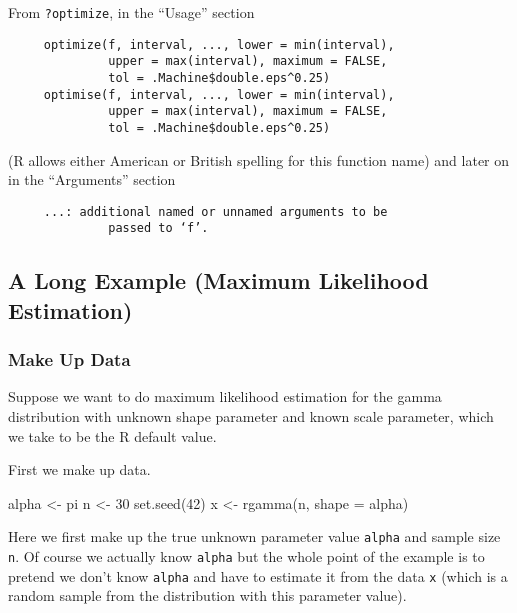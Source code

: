 \documentclass[
]{article}
\newenvironment{Shaded}{\begin{snugshade}}{\end{snugshade}}
\newcommand{\AttributeTok}[1]{\textcolor[rgb]{0.77,0.63,0.00}{#1}}
\newcommand{\DecValTok}[1]{\textcolor[rgb]{0.00,0.00,0.81}{#1}}
\newcommand{\FunctionTok}[1]{\textcolor[rgb]{0.00,0.00,0.00}{#1}}
\newcommand{\NormalTok}[1]{#1}
\newcommand{\OtherTok}[1]{\textcolor[rgb]{0.56,0.35,0.01}{#1}}
\begin{document}
From \texttt{?optimize}, in the ``Usage'' section

\begin{verbatim}
     optimize(f, interval, ..., lower = min(interval),
              upper = max(interval), maximum = FALSE,
              tol = .Machine$double.eps^0.25)
     optimise(f, interval, ..., lower = min(interval),
              upper = max(interval), maximum = FALSE,
              tol = .Machine$double.eps^0.25)
\end{verbatim}

(R allows either American or British spelling for this function name)
and later on in the ``Arguments'' section

\begin{verbatim}
     ...: additional named or unnamed arguments to be
              passed to ‘f’.
\end{verbatim}

\hypertarget{a-long-example-maximum-likelihood-estimation}{%
\subsection{A Long Example (Maximum Likelihood
Estimation)}\label{a-long-example-maximum-likelihood-estimation}}

\hypertarget{make-up-data}{%
\subsubsection{Make Up Data}\label{make-up-data}}

Suppose we want to do maximum likelihood estimation for the gamma
distribution with unknown shape parameter and known scale parameter,
which we take to be the R default value.

First we make up data.

\begin{Shaded}
\begin{Highlighting}[]
\NormalTok{alpha }\OtherTok{\textless{}{-}}\NormalTok{ pi}
\NormalTok{n }\OtherTok{\textless{}{-}} \DecValTok{30}
\FunctionTok{set.seed}\NormalTok{(}\DecValTok{42}\NormalTok{)}
\NormalTok{x }\OtherTok{\textless{}{-}} \FunctionTok{rgamma}\NormalTok{(n, }\AttributeTok{shape =}\NormalTok{ alpha)}
\end{Highlighting}
\end{Shaded}

Here we first make up the true unknown parameter value \texttt{alpha}
and sample size \texttt{n}. Of course we actually know \texttt{alpha}
but the whole point of the example is to pretend we don't know
\texttt{alpha} and have to estimate it from the data \texttt{x} (which
is a random sample from the distribution with this parameter value).
\end{document}
